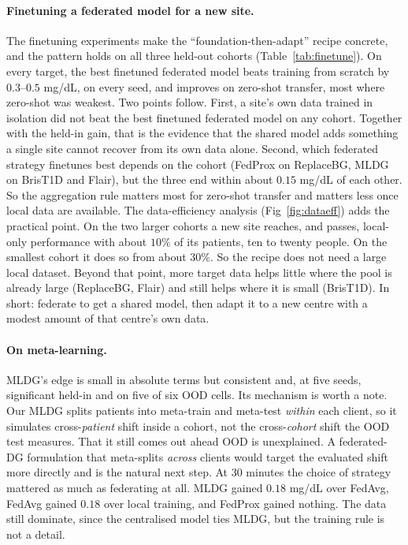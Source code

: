 \documentclass[10pt,letterpaper]{article}
\begin{document}
\paragraph{Finetuning a federated model for a new site.} The finetuning
experiments make the ``foundation-then-adapt'' recipe concrete, and the
pattern holds on all three held-out cohorts (Table~\ref{tab:finetune}). On
every target, the best finetuned federated model beats training from scratch
by $0.3$--$0.5$ mg/dL, on every seed, and improves on zero-shot transfer, most
where zero-shot was weakest. Two points follow. First, a site's own data
trained in isolation did not beat the best finetuned federated model on any
cohort. Together with the held-in gain, that is the evidence that the shared
model adds something a single site cannot recover from its own data alone.
Second, which federated strategy finetunes best depends on the cohort
(FedProx on ReplaceBG, MLDG on BrisT1D and Flair), but the three end within
about $0.15$ mg/dL of each other. So the aggregation rule matters most for
zero-shot transfer and matters less once local data are available. The
data-efficiency analysis (Fig~\ref{fig:dataeff}) adds the practical point.
On the two larger cohorts a new site reaches, and passes, local-only
performance with about $10\%$ of its patients, ten to twenty people. On the
smallest cohort it does so from about $30\%$. So the recipe does not need a
large local dataset. Beyond that point, more target data helps little where
the pool is already large (ReplaceBG, Flair) and still helps where it is
small (BrisT1D). In short: federate to get a shared model, then adapt it to
a new centre with a modest amount of that centre's own data.

\paragraph{On meta-learning.} MLDG's edge is small in absolute terms but
consistent and, at five seeds, significant held-in and on five of six OOD
cells. Its mechanism is worth a note. Our MLDG splits patients into
meta-train and meta-test \emph{within} each client, so it simulates
cross-\emph{patient} shift inside a cohort, not the cross-\emph{cohort} shift
the OOD test measures. That it still comes out ahead OOD is unexplained. A
federated-DG formulation that meta-splits \emph{across} clients would target
the evaluated shift more directly and is the natural next step. At 30
minutes the choice of strategy mattered as much as federating at all. MLDG
gained $0.18$ mg/dL over FedAvg, FedAvg gained $0.18$ over local training,
and FedProx gained nothing. The data still dominate, since the centralised
model ties MLDG, but the training rule is not a detail.
\end{document}
